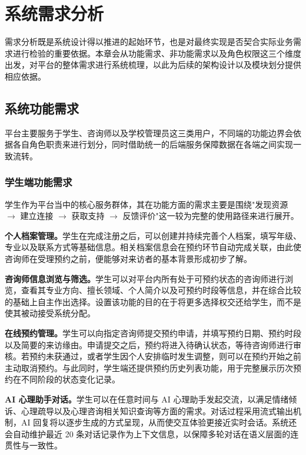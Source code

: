 \chapter{系统需求分析}

需求分析既是系统设计得以推进的起始环节，也是对最终实现是否契合实际业务需求进行检验的重要依据。本章会从功能需求、非功能需求以及角色权限这三个维度出发，对平台的整体需求进行系统梳理，以此为后续的架构设计以及模块划分提供相应依据。

\section{系统功能需求}

平台主要服务于学生、咨询师以及学校管理员这三类用户，不同端的功能边界会依据各自角色职责来进行划分，同时借助统一的后端服务保障数据在各端之间实现一致流转。

\subsection{学生端功能需求}

学生作为平台当中的核心服务群体，其在功能方面的需求主要是围绕"发现资源 $\rightarrow$ 建立连接 $\rightarrow$ 获取支持 $\rightarrow$ 反馈评价"这一较为完整的使用路径来进行展开。

\textbf{个人档案管理。}学生在完成注册之后，可以创建并持续完善个人档案，填写年级、专业以及联系方式等基础信息。相关档案信息会在预约环节自动完成关联，由此使咨询师在受理预约之前，便能够对来访者的基本背景形成初步了解。

\textbf{咨询师信息浏览与筛选。}学生可以对平台内所有处于可预约状态的咨询师进行浏览，查看其专业方向、擅长领域、个人简介以及可预约时段等信息，并在综合比较的基础上自主作出选择。设置该功能的目的在于将更多选择权交还给学生，而不是使其被动接受系统分配。

\textbf{在线预约管理。}学生可以向指定咨询师提交预约申请，并填写预约日期、预约时段以及简要的来访缘由。申请提交之后，预约将进入待确认状态，等待咨询师进行审核。若预约未获通过，或者学生因个人安排临时发生调整，则可以在预约开始之前主动取消预约。与此同时，学生端还提供预约历史列表功能，用于完整展示历次预约在不同阶段的状态变化记录。

\textbf{AI 心理助手对话。}学生可以在任意时间与 AI 心理助手发起交流，以满足情绪倾诉、心理疏导以及心理咨询相关知识查询等方面的需求。对话过程采用流式输出机制，AI 回复将以逐步生成的方式呈现，从而使交互体验更接近实时会话。系统还会自动维护最近 20 条对话记录作为上下文信息，以保障多轮对话在语义层面的连贯性与一致性。

